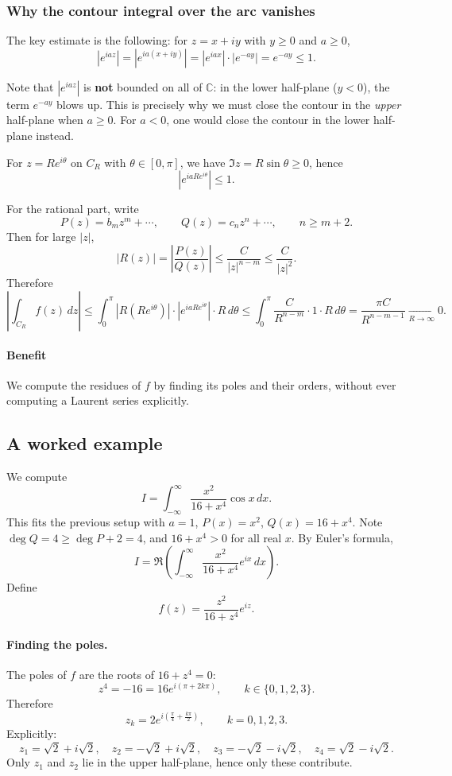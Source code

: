 \subsubsection*{Why the contour integral over the arc vanishes}

The key estimate is the following: for $z=x+iy$ with $y\geq 0$ and $a\geq 0$,
\[
|e^{iaz}|=|e^{ia(x+iy)}|=|e^{iax}|\cdot|e^{-ay}|=e^{-ay}\leq 1.
\]

\begin{remark}
Note that $|e^{iaz}|$ is \textbf{not} bounded on all of $\mathbb{C}$: in the lower half-plane ($y<0$), the term $e^{-ay}$ blows up. This is precisely why we must close the contour in the \emph{upper} half-plane when $a\geq 0$. For $a<0$, one would close the contour in the lower half-plane instead.
\end{remark}

For $z=Re^{i\theta}$ on $C_R$ with $\theta\in[0,\pi]$, we have $\Im z = R\sin\theta\geq 0$, hence
\[
|e^{iaRe^{i\theta}}|\leq 1.
\]

For the rational part, write
\[
P(z) = b_m z^m + \cdots, \qquad Q(z)=c_n z^n + \cdots, \qquad n\geq m+2.
\]
Then for large $|z|$,
\[
|R(z)| = \left|\frac{P(z)}{Q(z)}\right| \leq \frac{C}{|z|^{n-m}}\leq \frac{C}{|z|^2}.
\]
Therefore
\[
\left|\int_{C_R} f(z)\,dz\right|
\leq \int_0^\pi |R(Re^{i\theta})|\cdot|e^{iaRe^{i\theta}}|\cdot R\,d\theta
\leq \int_0^\pi \frac{C}{R^{n-m}}\cdot 1 \cdot R\,d\theta
=\frac{\pi C}{R^{n-m-1}}\xrightarrow[R\to\infty]{} 0.
\]

\paragraph{Benefit}
We compute the residues of $f$ by finding its poles and their orders, without ever computing a Laurent series explicitly.

\subsection{A worked example}

We compute
\[
I=\int_{-\infty}^{\infty} \frac{x^2}{16+x^4}\cos x\,dx.
\]
This fits the previous setup with $a=1$, $P(x)=x^2$, $Q(x)=16+x^4$. Note $\deg Q=4\geq \deg P+2=4$, and $16+x^4>0$ for all real $x$. By Euler's formula,
\[
I=\Re\!\left(\int_{-\infty}^{\infty} \frac{x^2}{16+x^4}e^{ix}\,dx\right).
\]
Define
\[
f(z)=\frac{z^2}{16+z^4}e^{iz}.
\]

\paragraph{Finding the poles.}
The poles of $f$ are the roots of $16+z^4=0$:
\[
z^4=-16=16e^{i(\pi+2k\pi)}, \qquad k\in\{0,1,2,3\}.
\]
Therefore
\[
z_k = 2 e^{i\left(\frac{\pi}{4}+\frac{k\pi}{2}\right)}, \qquad k=0,1,2,3.
\]
Explicitly:
\[
z_1 = \sqrt{2}+i\sqrt{2}, \quad
z_2 = -\sqrt{2}+i\sqrt{2}, \quad
z_3 = -\sqrt{2}-i\sqrt{2}, \quad
z_4 = \sqrt{2}-i\sqrt{2}.
\]
Only $z_1$ and $z_2$ lie in the upper half-plane, hence only these contribute.

